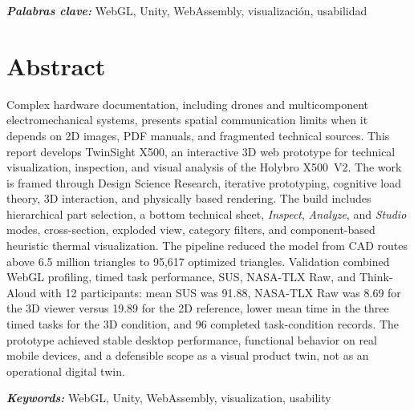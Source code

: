 \documentclass[12pt,letterpaper]{article}
\begin{document}
\hspace{1.27cm}\textit{\textbf{Palabras clave:}} WebGL, Unity, WebAssembly, visualización, usabilidad

\section{Abstract}
Complex hardware documentation, including drones and multicomponent electromechanical systems, presents spatial communication limits when it depends on 2D images, PDF manuals, and fragmented technical sources. This report develops TwinSight X500, an interactive 3D web prototype for technical visualization, inspection, and visual analysis of the Holybro X500~V2. The work is framed through Design Science Research, iterative prototyping, cognitive load theory, 3D interaction, and physically based rendering. The build includes hierarchical part selection, a bottom technical sheet, \textit{Inspect}, \textit{Analyze}, and \textit{Studio} modes, cross-section, exploded view, category filters, and component-based heuristic thermal visualization. The pipeline reduced the model from CAD routes above 6.5 million triangles to 95,617 optimized triangles. Validation combined WebGL profiling, timed task performance, SUS, NASA-TLX Raw, and Think-Aloud with 12 participants: mean SUS was 91.88, NASA-TLX Raw was 8.69 for the 3D viewer versus 19.89 for the 2D reference, lower mean time in the three timed tasks for the 3D condition, and 96 completed task-condition records. The prototype achieved stable desktop performance, functional behavior on real mobile devices, and a defensible scope as a visual product twin, not as an operational digital twin.

\hspace{1.27cm}\textit{\textbf{Keywords:}} WebGL, Unity, WebAssembly, visualization, usability

\setlength{\parindent}{1.27cm}

\clearpage
\tableofcontents

\clearpage
{}
{}
\listoftables

\clearpage
{}
{}
\listoffigures
\end{document}
